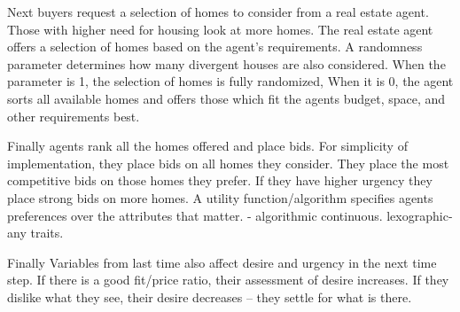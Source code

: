 Next buyers request a selection of homes to consider from a real estate agent. Those with higher need for housing look at more homes. The real estate agent offers a selection of homes based on the agent's requirements. A randomness parameter determines how many divergent houses are also considered. When the parameter is 1, the selection of homes is fully randomized, When it is 0, the agent sorts all available homes and offers those which fit the agents budget, space, and other requirements best.

Finally agents rank all the homes offered and place bids.  For simplicity of implementation, they place bids on all homes they consider. They place the most competitive bids on those homes they prefer. If they have higher urgency they place strong bids on more homes. 
A utility function/algorithm specifies agents preferences over the attributes that matter. - algorithmic continuous. lexographic- any traits. 

Finally Variables from last time also affect desire and urgency in the next time step. If there is a good fit/price ratio, their assessment of desire increases. If they dislike what they see, their desire decreases -- they settle for what is there. 



%
%
%
%
%
%


